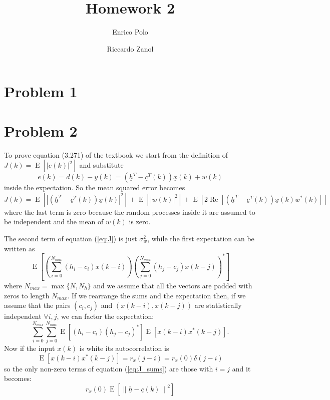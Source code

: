 \documentclass[a4paper,twoside]{article}
\author{Enrico Polo \and Riccardo Zanol}
\title{Homework 2}
\renewcommand{\vec}[1]{\underline{#1}}
\renewcommand{\Re}[1]{\operatorname{Re}\left[#1\right]}
\newcommand{\E}[1]{\operatorname{E}\left[#1\right]}
\newcommand{\norm}[1]{\left\lVert#1\right\rVert}
\newcommand{\abs}[1]{\left|#1\right|}
\begin{document}
\maketitle
\section*{Problem 1}
\section*{Problem 2}
To prove equation (3.271) of the textbook we start from the definition
of $J(k) = \E{\abs{e(k)}^2}$ and substitute
\[ e(k) = d(k) - y(k) = \left(\vec{h}^T - \vec{c}^T(k) \right) \vec{x}(k) + w(k) \]
inside the expectation. So the mean squared error becomes
\begin{equation}
  J(k) = \E{\abs{\left(\vec{h}^T - \vec{c}^T(k) \right) \vec{x}(k)}^2}
  + \E{\abs{w(k)}^2}
  + \E{2\Re{\left(\vec{h}^T - \vec{c}^T(k) \right) \vec{x}(k) w^*(k)}}
  \label{eq:J}
\end{equation}
where the last term is zero because the random processes inside it are
assumed to be independent and the mean of $w(k)$ is zero.

The second term of equation (\ref{eq:J}) is just $\sigma^2_w$, while
the first expectation can be written as
\[ \E{
  \left(\sum_{i=0}^{N_{max}}\left(h_i - c_i\right)x(k-i)\right)
  \left(\sum_{j=0}^{N_{max}}\left(h_j - c_j\right)x(k-j)\right)^* } \]
where $N_{max} = \max\{N, N_h\}$ and we assume that all the vectors
are padded with zeros to length $N_{max}$.  If we rearrange the sums
and the expectation then, if we assume that the pairs $(c_i,c_j)$ and
$(x(k-i),x(k-j))$ are statistically independent $\forall i,j$, we can
factor the expectation:
\begin{equation}
\sum_{i=0}^{N_{max}}\sum_{j=0}^{N_{max}}
\E{(h_i -c_i)(h_j-c_j)^*}
\E{x(k-i)x^*(k-j)} .
\label{eq:J_sums}
\end{equation}
Now if the input $x(k)$ is white its autocorrelation is
\[
\E{x(k-i)x^*(k-j)} = r_x(j-i) = r_x(0)\delta(j-i)
\]
so the only non-zero terms of equation (\ref{eq:J_sums}) are those
with $i=j$ and it becomes:
\begin{equation}
  r_x(0)\E{\norm{\vec{h}-\vec{c}(k)}^2}
  \label{eq:J_final_diff}
\end{equation}
\end{document}

